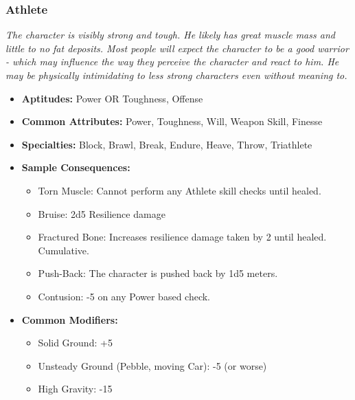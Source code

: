 \subsubsection{Athlete}\label{Athlete}
\textit{The character is visibly strong and tough.
He likely has great muscle mass and little to no fat deposits.
Most people will expect the character to be a good warrior - which may influence the way they perceive the character and react to him.
He may be physically intimidating to less strong characters even without meaning to.}
\begin{itemize}
	\item \textbf{Aptitudes:} Power OR Toughness, Offense
	\item \textbf{Common Attributes:} Power, Toughness, Will, Weapon Skill, Finesse
	\item \textbf{Specialties:} Block, Brawl, Break, Endure, Heave, Throw, Triathlete
	\item \textbf{Sample Consequences:} 
	\begin{itemize}
		\item Torn Muscle: Cannot perform any Athlete skill checks until healed.
		\item Bruise: 2d5 Resilience damage
		\item Fractured Bone: Increases resilience damage taken by 2 until healed. Cumulative.
		\item Push-Back: The character is pushed back by 1d5 meters.
		\item Contusion: -5 on any Power based check.
	\end{itemize}
	\item \textbf{Common Modifiers:}
	\begin{itemize}
		\item Solid Ground: +5
		\item Unsteady Ground (Pebble, moving Car): -5 (or worse)
		\item High Gravity: -15
	\end{itemize}
\end{itemize}



